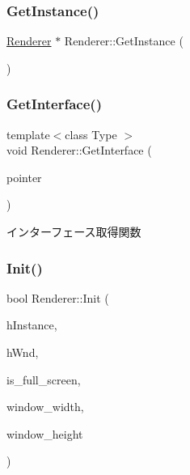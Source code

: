 \mbox{\label{class_renderer_a8c287bd7009d4717336ab1a9e1a556bd}} 
\subsubsection{\texorpdfstring{Get\+Instance()}{GetInstance()}}
{\footnotesize\ttfamily \mbox{\hyperlink{class_renderer}{Renderer}} $\ast$ Renderer\+::\+Get\+Instance (\begin{DoxyParamCaption}{ }\end{DoxyParamCaption})\hspace{0.3cm}{\ttfamily [static]}}

\mbox{\label{class_renderer_a15585698849fcba4722ac0f00b8b62e6}} 
\subsubsection{\texorpdfstring{Get\+Interface()}{GetInterface()}}
{\footnotesize\ttfamily template$<$class Type $>$ \\
void Renderer\+::\+Get\+Interface (\begin{DoxyParamCaption}\item[{Type $\ast$$\ast$}]{pointer }\end{DoxyParamCaption})\hspace{0.3cm}{\ttfamily [inline]}}



インターフェース取得関数 

\mbox{\label{class_renderer_a8d576add80187f5be3f24ec6a8108100}} 
\subsubsection{\texorpdfstring{Init()}{Init()}}
{\footnotesize\ttfamily bool Renderer\+::\+Init (\begin{DoxyParamCaption}\item[{H\+I\+N\+S\+T\+A\+N\+CE}]{h\+Instance,  }\item[{H\+W\+ND}]{h\+Wnd,  }\item[{B\+O\+OL}]{is\+\_\+full\+\_\+screen,  }\item[{int}]{window\+\_\+width,  }\item[{int}]{window\+\_\+height }\end{DoxyParamCaption})}



